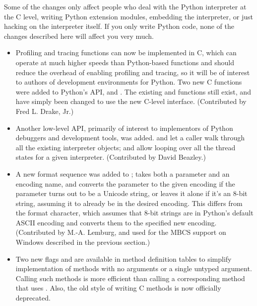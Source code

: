 \documentclass{howto}
\begin{document}
Some of the changes only affect people who deal with the Python
interpreter at the C level, writing Python extension modules,
embedding the interpreter, or just hacking on the interpreter itself.
If you only write Python code, none of the changes described here will
affect you very much.

\begin{itemize}

  \item Profiling and tracing functions can now be implemented in C,
  which can operate at much higher speeds than Python-based functions
  and should reduce the overhead of enabling profiling and tracing, so
  it will be of interest to authors of development environments for
  Python.  Two new C functions were added to Python's API,
   and .
  The existing  and
   functions still exist, and have simply
  been changed to use the new C-level interface.  (Contributed by Fred
  L. Drake, Jr.)

  \item Another low-level API, primarily of interest to implementors
  of Python debuggers and development tools, was added.
   and
   let a caller walk through all
  the existing interpreter objects;
   and
   allow looping over all the thread
  states for a given interpreter.  (Contributed by David Beazley.)

  \item A new  format sequence was added to
  ;  takes both a parameter and
  an encoding name, and converts the parameter to the given encoding
  if the parameter turns out to be a Unicode string, or leaves it
  alone if it's an 8-bit string, assuming it to already be in the
  desired encoding.  This differs from the  format character,
  which assumes that 8-bit strings are in Python's default ASCII
  encoding and converts them to the specified new encoding.
  (Contributed by M.-A. Lemburg, and used for the MBCS support on
  Windows described in the previous section.)
 
  \item Two new flags  and  are
   available in method definition tables to simplify implementation of
   methods with no arguments or a single untyped argument. Calling
   such methods is more efficient than calling a corresponding method
   that uses . 
   Also, the old  style of writing C methods is 
   now officially deprecated.  


\end{itemize}
\end{document}
